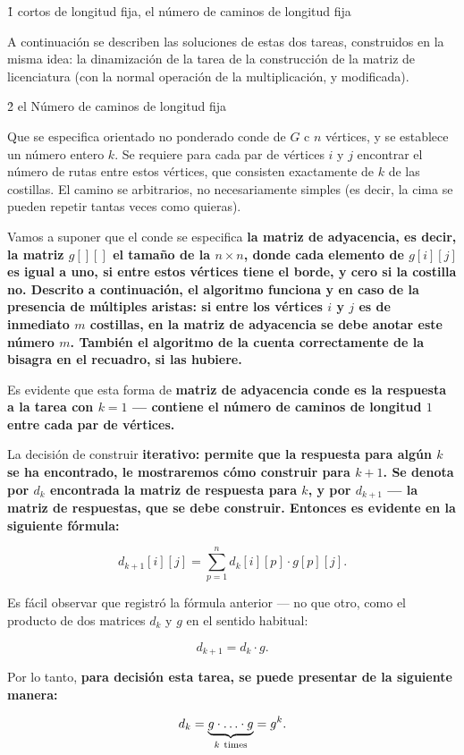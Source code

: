 \h1{ cortos de longitud fija, el número de caminos de longitud fija }

A continuación se describen las soluciones de estas dos tareas, construidos en la misma idea: la dinamización de la tarea de la construcción de la matriz de licenciatura (con la normal operación de la multiplicación, y modificada).


\h2{ el Número de caminos de longitud fija }

Que se especifica orientado no ponderado conde de $G$ c $n$ vértices, y se establece un número entero $k$. Se requiere para cada par de vértices $i$ y $j$ encontrar el número de rutas entre estos vértices, que consisten exactamente de $k$ de las costillas. El camino se arbitrarios, no necesariamente simples (es decir, la cima se pueden repetir tantas veces como quieras).

Vamos a suponer que el conde se especifica \bf{la matriz de adyacencia}, es decir, la matriz $g[][]$ el tamaño de la $n \times n$, donde cada elemento de $g[i][j]$ es igual a uno, si entre estos vértices tiene el borde, y cero si la costilla no. Descrito a continuación, el algoritmo funciona y en caso de la presencia de múltiples aristas: si entre los vértices $i$ y $j$ es de inmediato $m$ costillas, en la matriz de adyacencia se debe anotar este número $m$. También el algoritmo de la cuenta correctamente de la bisagra en el recuadro, si las hubiere.

Es evidente que esta forma de \bf{matriz de adyacencia} conde es \bf{la respuesta a la tarea con $k=1$} --- contiene el número de caminos de longitud $1$ entre cada par de vértices.

La decisión de construir \bf{iterativo}: permite que la respuesta para algún $k$ se ha encontrado, le mostraremos cómo construir para $k+1$. Se denota por $d_k$ encontrada la matriz de respuesta para $k$, y por $d_{k+1}$ --- la matriz de respuestas, que se debe construir. Entonces es evidente en la siguiente fórmula:

$$ d_{k+1}[i][j] = \sum_{p = 1}^{n} d_k[i][p] \cdot g[p][j]. $$

Es fácil observar que registró la fórmula anterior --- no que otro, como el producto de dos matrices $d_k$ y $g$ en el sentido habitual:

$$ d_{k+1} = d_k \cdot g. $$

Por lo tanto, \bf{para decisión} esta tarea, se puede presentar de la siguiente manera:

$$ d_k = \underbrace{ g \cdot \ldots \cdot g}_{k\ {\rm times}} = g^k. $$

